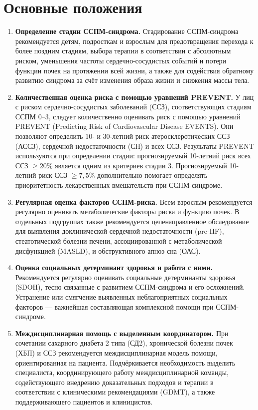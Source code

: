 \documentclass[11pt,a4paper]{article}
\begin{document}
\section*{Основные положения}
\begin{enumerate}[label=\arabic*.]
\item \textbf{Определение стадии ССПМ-синдрома.} Стадирование ССПМ-синдрома рекомендуется детям, подросткам и взрослым для предотвращения перехода к более поздним стадиям, выбора терапии в соответствии с абсолютным риском, уменьшения частоты сердечно-сосудистых событий и потери функции почек на протяжении всей жизни, а также для содействия обратному развитию синдрома за счёт изменения образа жизни и снижения массы тела.

\item \textbf{Количественная оценка риска с помощью уравнений PREVENT.} У лиц с риском сердечно-сосудистых заболеваний (ССЗ), соответствующих стадиям ССПМ 0--3, следует количественно оценивать риск с помощью уравнений PREVENT (Predicting Risk of Cardiovascular Disease EVENTS). Они позволяют определить 10- и 30-летний риск атеросклеротических ССЗ (АССЗ), сердечной недостаточности (СН) и всех ССЗ. Результаты PREVENT используются при определении стадии: прогнозируемый 10-летний риск всех ССЗ $\geq20\%$ является одним из критериев стадии 3. Прогнозируемый 10-летний риск ССЗ $\geq7{,}5\%$ дополнительно помогает определять приоритетность лекарственных вмешательств при ССПМ-синдроме.

\item \textbf{Регулярная оценка факторов ССПМ-риска.} Всем взрослым рекомендуется регулярно оценивать метаболические факторы риска и функцию почек. В отдельных подгруппах также рекомендуется целенаправленное обследование для выявления доклинической сердечной недостаточности (pre-HF), стеатотической болезни печени, ассоциированной с метаболической дисфункцией (MASLD), и обструктивного апноэ сна (ОАС).

\item \textbf{Оценка социальных детерминант здоровья и работа с ними.} Рекомендуется регулярно оценивать социальные детерминанты здоровья (SDOH), тесно связанные с развитием ССПМ-синдрома и его осложнений. Устранение или смягчение выявленных неблагоприятных социальных факторов --- важнейшая составляющая комплексной помощи при ССПМ-синдроме.

\item \textbf{Междисциплинарная помощь с выделенным координатором.} При сочетании сахарного диабета 2 типа (СД2), хронической болезни почек (ХБП) и ССЗ рекомендуется междисциплинарная модель помощи, ориентированная на пациента. Подчёркивается необходимость выделить специалиста, координирующего работу междисциплинарной команды, содействующего внедрению доказательных подходов и терапии в соответствии с клиническими рекомендациями (GDMT), а также поддерживающего пациентов и клиницистов.


\end{enumerate}
\end{document}
